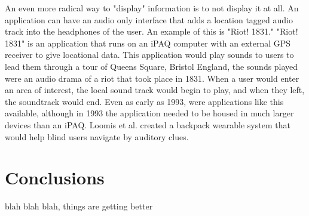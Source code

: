 \documentclass{acm_proc_article-sp}
\begin{document}
An even more radical way to "display" information is to not display it at all.  An application can have an audio only interface that adds a location tagged audio track into the headphones of the user.  An example of this is "Riot! 1831." "Riot! 1831" is an application that runs on an iPAQ computer with an external GPS receiver to give locational data. This application would play sounds to users to lead them through a tour of Queens Square, Bristol England, the sounds played were an audio drama of a riot that took place in 1831.  When a user would enter an area of interest, the local sound track would begin to play, and when they left, the soundtrack would end. \cite{reid2004riot} \cite{reid2005parallel}   Even as early as 1993, were applications like this available, although in 1993 the application needed to be housed in much larger devices than an iPAQ.  Loomis et al. created a backpack wearable system that would help blind users navigate by auditory clues. \cite{loomis1994personal}

\section{Conclusions}
blah blah blah, things are getting better



\end{document}
